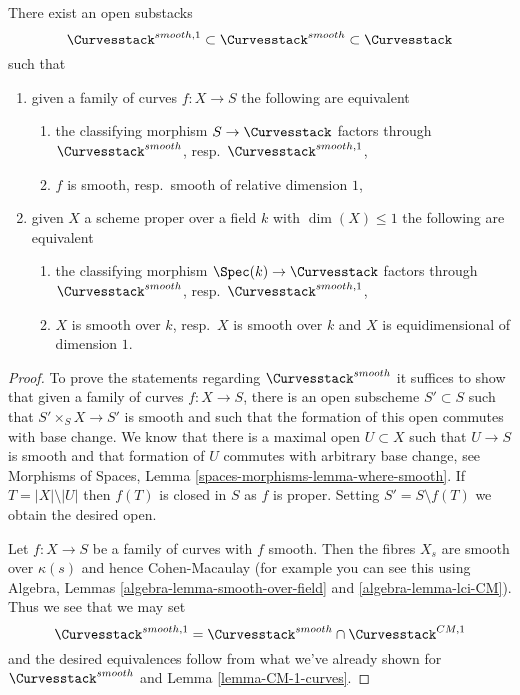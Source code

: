 \begin{lemma}
\label{lemma-smooth-curves}
There exist an open substacks
$$
\Curvesstack^{smooth, 1} \subset \Curvesstack^{smooth} \subset \Curvesstack
$$
such that
\begin{enumerate}
\item given a family of curves $f : X \to S$ the following are equivalent
\begin{enumerate}
\item the classifying morphism $S \to \Curvesstack$ factors
through $\Curvesstack^{smooth}$, resp.\ $\Curvesstack^{smooth, 1}$,
\item $f$ is smooth, resp.\ smooth of relative dimension $1$,
\end{enumerate}
\item given $X$ a scheme proper over a field $k$ with
$\dim(X) \leq 1$ the following are equivalent
\begin{enumerate}
\item the classifying morphism $\Spec(k) \to \Curvesstack$
factors through $\Curvesstack^{smooth}$, resp.\ $\Curvesstack^{smooth, 1}$,
\item $X$ is smooth over $k$, resp.\ $X$ is smooth over $k$ and
$X$ is equidimensional of dimension $1$.
\end{enumerate}
\end{enumerate}
\end{lemma}

\begin{proof}
To prove the statements regarding $\Curvesstack^{smooth}$
it suffices to show that given a family of curves
$f : X \to S$, there is an open subscheme $S' \subset S$
such that $S' \times_S X \to S'$ is smooth and such that the
formation of this open commutes with base change.
We know that there is a maximal open $U \subset X$ such
that $U \to S$ is smooth and that formation of $U$ commutes
with arbitrary base change, see
Morphisms of Spaces, Lemma \ref{spaces-morphisms-lemma-where-smooth}.
If $T = |X| \setminus |U|$ then $f(T)$ is closed in $S$ as $f$ is proper.
Setting $S' = S \setminus f(T)$ we obtain the desired open.

\medskip\noindent
Let $f : X \to S$ be a family of curves with $f$ smooth.
Then the fibres $X_s$ are smooth over $\kappa(s)$ and hence
Cohen-Macaulay (for example you can see this using
Algebra, Lemmas \ref{algebra-lemma-smooth-over-field} and
\ref{algebra-lemma-lci-CM}). Thus we see that we may set
$$
\Curvesstack^{smooth, 1} = \Curvesstack^{smooth} \cap
\Curvesstack^{CM, 1}
$$
and the desired equivalences follow from what we've already
shown for $\Curvesstack^{smooth}$ and Lemma \ref{lemma-CM-1-curves}.
\end{proof}

